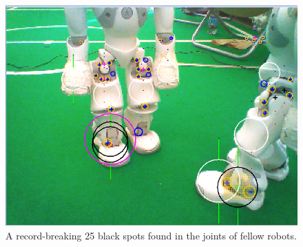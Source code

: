 \documentclass[11pt, twocolumn]{article}
\begin{document}
\begin{figure}[h]
\label{fig:false positives}
\centering
\includegraphics[scale=0.5]{s4.png}
\caption{A record-breaking 25 black spots found in the joints of fellow robots.}
\end{figure}
\end{document}
